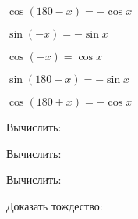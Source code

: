 \begin{listofex}
{{\begin{minipage}[t]{0,32\textwidth}
				\( \cos(180 - x) = -\cos x \)
			\end{minipage}
			\begin{minipage}[t]{0,32\textwidth}
				
				\( \sin(-x) = -\sin x \)
				
				\( \cos(-x) = \cos x \)
			\end{minipage}
			\begin{minipage}[t]{0,32\textwidth}
				
				\( \sin(180+x) = -\sin x \)
				
				\( \cos(180+x) = -\cos x \)
			\end{minipage}
		}
	}
	\item Вычислить:
	\begin{enumcols}[itemcolumns=1]
		\item {}
		\item {}
		\item {}
	\end{enumcols}
	\item Вычислить:
	\begin{enumcols}[itemcolumns=2]
		\item {}
		\item {}
		\item {}
		\item {}
	\end{enumcols}
	\item Вычислить:
	\begin{enumcols}[itemcolumns=2]
		\item {}
		\item {}
		\item {}
	\end{enumcols}
	\item Доказать тождество:
	\begin{enumcols}[itemcolumns=2]
		\item {}
		\item {}
		\item {}
		\item {}
		\item {}
		\item {}
	\end{enumcols}
	\item {}
	\item {}
	\item {}
\end{listofex}
